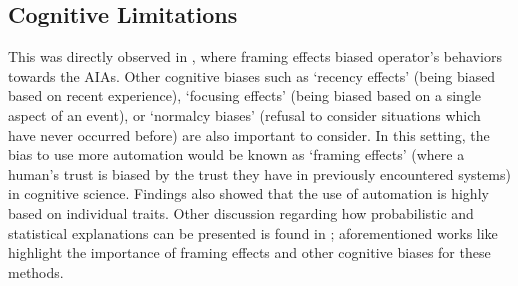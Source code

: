 \subsection{Cognitive Limitations}
This was directly observed in \cite{Freedy2007-sg,Riley1996-qm}, where framing effects biased operator's behaviors towards the AIAs. 
Other cognitive biases such as `recency effects' (being biased based on recent experience), `focusing effects' (being biased based on a single aspect of an event), or `normalcy biases' (refusal to consider situations which have never occurred before) are also important to consider. 
\citet{Riley1996-qm}In this setting, the bias to use more automation would be known as `framing effects' (where a human's trust is biased by the trust they have in previously encountered systems) in cognitive science. Findings also showed that the use of automation is highly based on individual traits.
Other discussion regarding how probabilistic and statistical explanations can be presented is found in \cite{Rouse1986-dz,Wallace2001-fm,Kuhn1997-qc,Lomas2012-ie,Swartout1983-ko}; 
aforementioned works like \cite{Kuhn1997-qc} highlight the importance of framing effects and other cognitive biases for these methods. 



